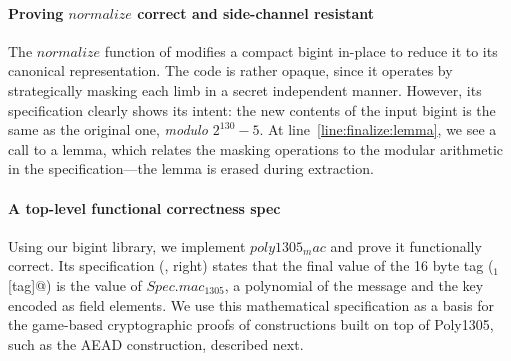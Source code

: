 \paragraph*{Proving \lst$normalize$ correct and side-channel resistant}
The \lst$normalize$ function of  modifies a compact
bigint in-place to reduce it to its canonical representation. The code
is rather opaque, since it operates by strategically masking each limb
in a secret independent manner. However, its specification clearly
shows its intent: the new contents of the input bigint is the same as
the original one, \emph{modulo $2^{130}-5$}. At
line~\autoref{line:finalize:lemma}, we see a call to a \fstar lemma,
which relates the masking operations to the modular arithmetic in the
specification---the lemma is erased during extraction.

\paragraph*{A top-level functional correctness spec} Using our
bigint library, we implement \lst$poly1305_mac$ and prove it
functionally correct. Its specification (, right)
states that the final value of the 16 byte tag (\lst@m$_1$[tag]@) is the
value of \lst$Spec.mac_1305$, a polynomial of the message and the key
encoded as field elements. We use this mathematical specification as a
basis for the game-based cryptographic proofs of constructions built
on top of Poly1305, such as the AEAD construction, described next.




